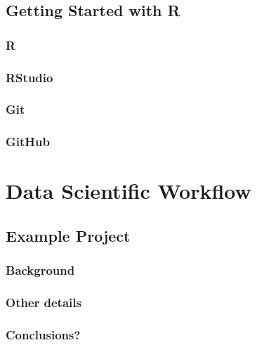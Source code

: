 \documentclass[
]{book}
\begin{document}
\hypertarget{start_R}{%
\chapter{Getting Started with R}\label{start_R}}

\hypertarget{r}{%
\section{R}\label{r}}

\hypertarget{rstudio}{%
\section{RStudio}\label{rstudio}}

\hypertarget{git}{%
\section{Git}\label{git}}

\hypertarget{github}{%
\section{GitHub}\label{github}}

\hypertarget{part-data-scientific-workflow}{%
\part*{Data Scientific Workflow}\label{part-data-scientific-workflow}}

\hypertarget{ex_proj}{%
\chapter{Example Project}\label{ex_proj}}

\hypertarget{background}{%
\section{Background}\label{background}}

\hypertarget{other-details}{%
\section{Other details}\label{other-details}}

\hypertarget{conclusions}{%
\section{Conclusions?}\label{conclusions}}
\end{document}
